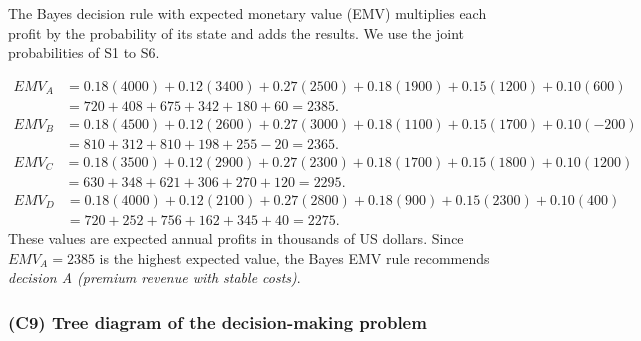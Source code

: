The Bayes decision rule with expected monetary value (EMV) multiplies each profit by the probability of its state and adds
the results. We use the joint probabilities of S1 to S6.

\[
\begin{aligned}
EMV_A &= 0.18(4000) + 0.12(3400) + 0.27(2500) + 0.18(1900) + 0.15(1200) + 0.10(600) \\
&= 720 + 408 + 675 + 342 + 180 + 60 = 2385.
\end{aligned}
\]
\[
\begin{aligned}
EMV_B &= 0.18(4500) + 0.12(2600) + 0.27(3000) + 0.18(1100) + 0.15(1700) + 0.10(-200) \\
&= 810 + 312 + 810 + 198 + 255 - 20 = 2365.
\end{aligned}
\]
\[
\begin{aligned}
EMV_C &= 0.18(3500) + 0.12(2900) + 0.27(2300) + 0.18(1700) + 0.15(1800) + 0.10(1200) \\
&= 630 + 348 + 621 + 306 + 270 + 120 = 2295.
\end{aligned}
\]
\[
\begin{aligned}
EMV_D &= 0.18(4000) + 0.12(2100) + 0.27(2800) + 0.18(900) + 0.15(2300) + 0.10(400) \\
&= 720 + 252 + 756 + 162 + 345 + 40 = 2275.
\end{aligned}
\]
These values are expected annual profits in thousands of US dollars. Since \(EMV_A = 2385\) is the highest expected value,
the Bayes EMV rule recommends \emph{decision A (premium revenue with stable costs)}.

\subsubsection{(C9) Tree diagram of the decision-making problem}\label{subsubsec:example3-c9}

